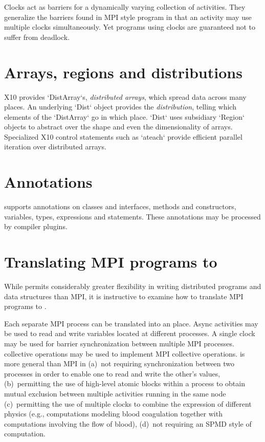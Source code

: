 Clocks act as {barriers} for a dynamically varying collection of activities.
They generalize the barriers found in MPI style program in that an activity
may use multiple clocks simultaneously. Yet programs using clocks are
guaranteed not to suffer from deadlock.


\section{Arrays, regions and distributions}

X10 provides \xcd`DistArray`s, {\em distributed arrays}, which spread data
across many places. An underlying \xcd`Dist` object provides the {\em
distribution}, telling which elements of the \xcd`DistArray` go in which
place. \xcd`Dist` uses subsidiary \xcd`Region` objects to abstract over the
shape and even the dimensionality of arrays.
Specialized X10 control statements such as \xcd`ateach` provide efficient
parallel iteration over distributed arrays.


\section{Annotations}

\Xten{} supports annotations on classes and interfaces, methods
and constructors,
variables, types, expressions and statements.
These annotations may be processed by compiler plugins.

\section{Translating MPI programs to \Xten{}}

While \Xten{} permits considerably greater flexibility in writing
distributed programs and data structures than MPI, it is instructive
to examine how to translate MPI programs to \Xten.

Each separate MPI process can be translated into an \Xten{}
place. Async activities may be used to read and write variables
located at different processes. A single clock may be used for barrier
synchronization between multiple MPI processes. \Xten{} collective
operations may be used to implement MPI collective operations.
\Xten{} is more general than MPI in (a)~not requiring synchronization
between two processes in order to enable one to read and write the
other's values, (b)~permitting the use of high-level atomic blocks
within a process to obtain mutual exclusion between multiple
activities running in the same node (c)~permitting the use of multiple
clocks to combine the expression of different physics (e.g.,
computations modeling blood coagulation together with computations
involving the flow of blood), (d)~not requiring an SPMD style of
computation.


